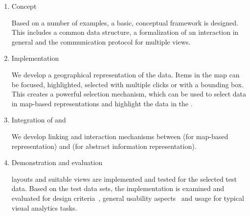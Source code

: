 \begin{enumerate}
  \item
    Concept

    Based on a number of examples, a basic, conceptual framework is designed.
    This includes a common data structure, a formalization of an interaction in general and the communication protocol for multiple views.

  \item
    Implementation

    We develop a geographical representation of the data.
    Items in the map can be focused, highlighted, selected with multiple clicks or with a bounding box.
    This creates a powerful selection mechanism, which can be used to select data in map-based representations and highlight the data in the \tmap{}.

  \item
    Integration of \tmap{} and \map{}

    We develop linking and interaction mechanisms between \maps{} (for map-based representation) and \tmaps{} (for abstract information representation).

  \item
    Demonstration and evaluation

    \cmv{} layouts and suitable views are implemented and tested for the selected test data.
    Based on the test data sets, the \cmv{} implementation is examined and evaluated for design criteria~\cite{Baldonado2000}, general usability aspects~\cite{Roberts2007} and usage for typical visual analytics tasks.
\end{enumerate}

